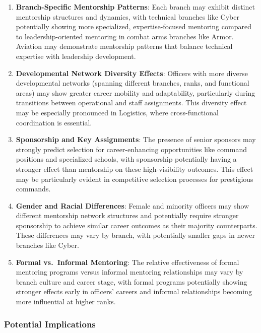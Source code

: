 \documentclass[
  letterpaper,
  DIV=11,
  numbers=noendperiod]{scrartcl}
\begin{document}
\begin{enumerate}
\def\labelenumi{\arabic{enumi}.}
\item
  \textbf{Branch-Specific Mentorship Patterns}: Each branch may exhibit
  distinct mentorship structures and dynamics, with technical branches
  like Cyber potentially showing more specialized, expertise-focused
  mentoring compared to leadership-oriented mentoring in combat arms
  branches like Armor. Aviation may demonstrate mentorship patterns that
  balance technical expertise with leadership development.
\item
  \textbf{Developmental Network Diversity Effects}: Officers with more
  diverse developmental networks (spanning different branches, ranks,
  and functional areas) may show greater career mobility and
  adaptability, particularly during transitions between operational and
  staff assignments. This diversity effect may be especially pronounced
  in Logistics, where cross-functional coordination is essential.
\item
  \textbf{Sponsorship and Key Assignments}: The presence of senior
  sponsors may strongly predict selection for career-enhancing
  opportunities like command positions and specialized schools, with
  sponsorship potentially having a stronger effect than mentorship on
  these high-visibility outcomes. This effect may be particularly
  evident in competitive selection processes for prestigious commands.
\item
  \textbf{Gender and Racial Differences}: Female and minority officers
  may show different mentorship network structures and potentially
  require stronger sponsorship to achieve similar career outcomes as
  their majority counterparts. These differences may vary by branch,
  with potentially smaller gaps in newer branches like Cyber.
\item
  \textbf{Formal vs.~Informal Mentoring}: The relative effectiveness of
  formal mentoring programs versus informal mentoring relationships may
  vary by branch culture and career stage, with formal programs
  potentially showing stronger effects early in officers' careers and
  informal relationships becoming more influential at higher ranks.
\end{enumerate}

\subsubsection{Potential Implications}\label{potential-implications}
\end{document}
